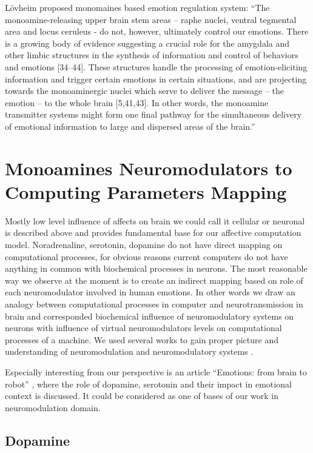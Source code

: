 L\"{o}vheim proposed monomaines based emotion regulation system: ``The monoamine-releasing upper brain stem areas – raphe nuclei, ventral tegmental area and locus ceruleus - do not, however, ultimately control our emotions. There is a growing body of evidence suggesting a crucial role for the amygdala and other limbic structures in the synthesis of information and control of behaviors and emotions [34–44]. These structures handle the processing of emotion-eliciting information and trigger certain emotions in certain situations, and are projecting towards the monoaminergic nuclei which serve to deliver the message – the emotion – to the whole brain [5,41,43]. In other words, the monoamine transmitter systems might form one final pathway for the simultaneous delivery of emotional information to large and dispersed areas of the brain.''

\section{Monoamines Neuromodulators to Computing Parameters Mapping}

Mostly low level influence of affects on brain we could call it cellular or neuronal is described above and provides fundamental base for our affective computation model. Noradrenaline, serotonin, dopamine do not have direct mapping on computational processes, for obvious reasons current computers do not have anything in common with biochemical processes in neurons. The most reasonable way we observe at the moment is to create an indirect mapping based on role of each neuromodulator involved in human emotions. In other words we draw an analogy between computational processes in computer and neurotransmission in brain and corresponded biochemical influence of neuromodulatory systems on neurons with influence of virtual neuromodulators levels on computational processes of a machine. We used several works to gain proper picture and understanding of neuromodulation and neuromodulatory systems \cite{cubeofemotions, neuromodulatory, on_role_of_emotion}. 

Especially interesting from our perspective is an article ``Emotions: from brain to robot'' \cite{emotionsbraintorobot}, where the role of dopamine, serotonin and their impact in emotional context is discussed. It could be considered as one of bases of our work in neuromodulation domain.

\subsection{Dopamine}

